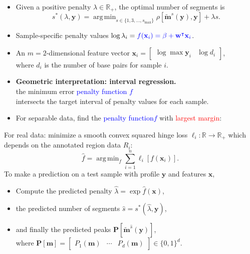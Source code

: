 \documentclass[legalpaper]{article}
\newcommand{\RR}{\mathbb R}
\DeclareMathOperator*{\argmin}{arg\,min}
\begin{document}
\begin{itemize}
\item Given a positive penalty $\lambda\in\RR_+$, the optimal number
  of segments is
\begin{equation*} s^*(\lambda, \mathbf y) =
    \argmin_{s\in\{1,3,\dots, s_{\text{max}}\}} \rho\left[
      \mathbf{\tilde m}^s(\mathbf y), \mathbf y \right] + \lambda s.
\end{equation*}
\item Sample-specific penalty values $\log \lambda_i = 
\textcolor{blue}{
  f(\mathbf x_i)
  = \beta + \mathbf w^\intercal \mathbf x_i
}$.
\item An $m=2$-dimensional feature vector
$\mathbf x_i = \left[\begin{array}{cc} \log\max \mathbf y_i & \log d_i
\end{array}\right]$,\\ where $d_i$ is the number of base pairs for 
sample $i$.
\item \textbf{Geometric interpretation: interval regression.} \\
  the minimum error
  \textcolor{blue}{penalty function $f$} \\
  intersects the target
  interval of penalty values for each sample.
\item For separable data, find the 
  \textcolor{blue}{penalty function$f$} 
with
\textcolor{red}{largest margin}:\\

\end{itemize}

\newpage

For real data: minimize a smooth convex squared hinge loss
$\ell_i:\RR\rightarrow\RR_+$ which depends on the annotated region
data $R_i$:
\begin{equation*}
  \label{eq:relax}
  \hat f = \argmin_f \sum_{i=1}^n
  \ell_i\left[ f(\mathbf x_i) \right].
\end{equation*}
To make a prediction on a
test sample with profile $\mathbf y$ and features $\mathbf x$,
\begin{itemize}
\item Compute the predicted penalty $\hat \lambda = \exp \hat f(\mathbf x)$,
\item the predicted number of segments $\hat s = s^*(\hat \lambda, \mathbf
y)$, 
\item and finally the predicted peaks $\mathbf P\left[ \mathbf{\tilde
    m}^{\hat s}(\mathbf y) \right]$,\\
where $\mathbf P[\mathbf m] = \left[\begin{array}{ccc}
    P_1(\mathbf m) & \cdots & P_d(\mathbf m)
\end{array}\right]\in\{0, 1\}^d$.
\end{itemize}
\end{document}
